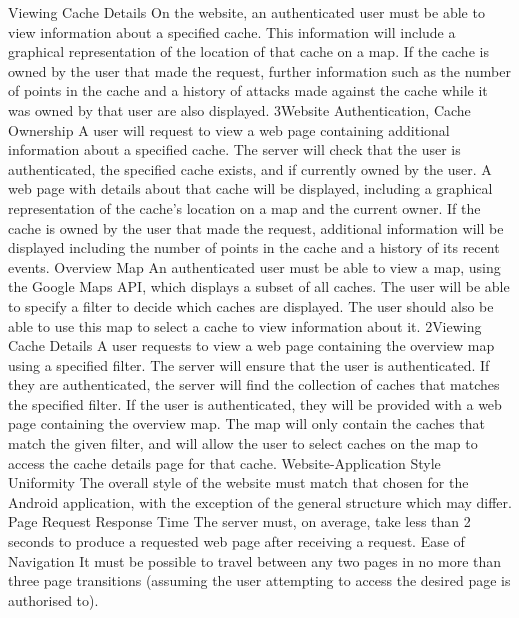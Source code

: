 		\funcreq %
			{Viewing Cache Details}
			{On the website, an authenticated user must be able to view
			information about a specified cache. This information will include
			a graphical representation of the location of that cache on a map.
			If the cache is owned by the user that made the request, further
			information such as the number of points in the cache and a history 
			of attacks made against the cache while it was owned by that user
			are also displayed.}
			{3}{Website Authentication, Cache Ownership}
			{A user will request to view a web page containing additional
			information about a specified cache.}
			{The server will check that the user is authenticated, the
			specified cache	exists, and if currently owned by the user.}
			{A web page with details about that cache will be displayed,
			including a graphical representation of the cache's location on a
			map and the current owner. If the cache is owned by the user that
			made the request, additional information will be displayed
			including the number of points in the cache and a history of its
			recent events.}
		\funcreq %
			{Overview Map}
			{An authenticated user must be able to view a map, using the Google
			Maps API, which displays a subset of all caches. The user will be
			able to specify a filter to decide which caches are displayed. The
			user should also be able to use this map to select a cache to view
			information about it.}
			{2}{Viewing Cache Details}
			{A user requests to view a web page containing the overview map
			using a specified filter.}
			{The server will ensure that the user is authenticated. If they are
			authenticated, the server will find the collection of caches that
			matches the specified filter.}
			{If the user is authenticated, they will be provided with a web 
			page containing the overview map. The map will only contain the
			caches that match the given filter, and will allow the user to
			select caches on the map to access the cache details page for that
			cache.}
		\nonfuncreq %
			{Website-Application Style Uniformity}
			{The overall style of the website must match that chosen for the
			Android application, with the exception of the general structure
			which may differ.}
		\nonfuncreq %
			{Page Request Response Time}
			{The server must, on average, take less than 2 seconds to produce
			a requested web page after receiving a request.}
		\nonfuncreq %
			{Ease of Navigation}
			{It must be possible to travel between any two pages in no more
			than three page transitions (assuming the user attempting to
			access the desired page is authorised to).}

\renewcommand{\arraystretch}{1}
